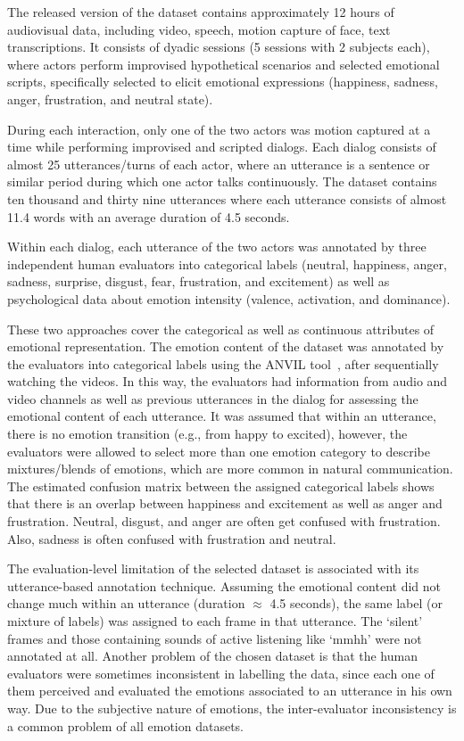 \documentclass[10pt,journal,cspaper,compsoc]{IEEEtran}
\begin{document}
The released version of the dataset contains approximately 12 hours of audiovisual data, including video, speech, motion capture of face, text transcriptions. It consists of dyadic sessions (5 sessions with 2 subjects each), where actors perform improvised hypothetical scenarios and selected emotional scripts, specifically selected to elicit emotional expressions (happiness, sadness, anger, frustration, and neutral state).

During each interaction, only one of the two actors was motion captured at a time while performing improvised and scripted dialogs. Each dialog consists of almost 25 utterances/turns of each actor, where an utterance is a sentence or similar period during which one actor talks continuously. The dataset contains ten thousand and thirty nine utterances where each utterance consists of almost 11.4 words with an average duration of 4.5 seconds. 

Within each dialog, each utterance of the two actors was annotated by three independent human evaluators into categorical labels (neutral, happiness, anger, sadness, surprise, disgust, fear, frustration, and excitement) as well as psychological data about emotion intensity (valence, activation, and dominance). 

These two approaches cover the categorical as well as continuous attributes of emotional representation. The emotion content of the dataset was annotated by the evaluators into categorical labels using the ANVIL tool~\cite{Kipp2001Anvil}, after sequentially watching the videos. In this way, the evaluators had information from audio and video channels as well as previous utterances in the dialog for assessing the emotional content of each utterance. It was assumed that within an utterance, there is no emotion transition (e.g., from happy to excited), however, the evaluators were allowed to select more than one emotion category to describe mixtures/blends of emotions, which are more common in natural communication. The estimated confusion matrix between the assigned categorical labels shows that there is an overlap between happiness and excitement as well as anger and frustration. Neutral, disgust, and anger are often get confused with frustration. Also, sadness is often confused with frustration and neutral.

The evaluation-level limitation of the selected dataset is associated with its utterance-based annotation technique. Assuming the emotional content did not change much within an utterance (duration $\approx$ 4.5 seconds), the same label (or mixture of labels) was assigned to each frame in that utterance. The `silent' frames and those containing sounds of active listening like `mmhh' were not annotated at all. Another problem of the chosen dataset is that the human evaluators were sometimes inconsistent in labelling the data, since each one of them perceived and evaluated the emotions associated to an utterance in his own way. Due to the subjective nature of emotions, the inter-evaluator inconsistency is a common problem of all emotion datasets.
\end{document}

